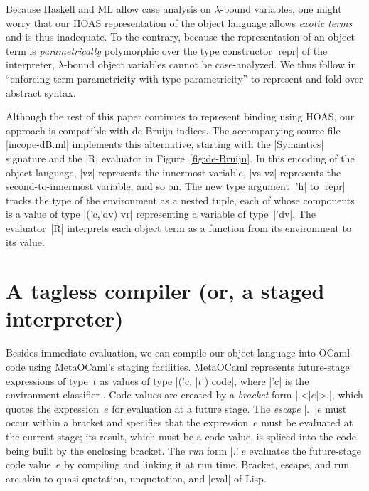 Because Haskell and ML allow case analysis on $\lambda$-bound variables,
one might worry that our HOAS representation of the object language
allows \emph{exotic terms} and is thus inadequate.  To the contrary,
because the representation of an object term is \emph{parametrically}
polymorphic over the type constructor |repr| of the interpreter,
$\lambda$-bound object variables cannot be case-analyzed.
We thus follow \citet{washburn-boxes-jfp} in ``enforcing term
parametricity with type parametricity'' to represent and fold over
abstract syntax.

Although the rest of this paper continues to represent binding
using HOAS\@, our approach is compatible with de Bruijn indices.
The accompanying source file |incope-dB.ml| implements this
alternative, starting with the |Symantics| signature and the |R|
evaluator in Figure~\ref{fig:de-Bruijn}.
In this encoding of the object language, |vz| represents the
innermost variable, |vs vz| represents the second-to-innermost variable,
and so on.  The new type argument |'h| to |repr| tracks the type of
the environment as a nested tuple, each of whose components is a
value of type |('c,'dv) vr| representing a variable of type~|'dv|.
The evaluator~|R| interprets each object term as a function
from its environment to its value.

\section{A tagless compiler (or, a staged interpreter)}\label{S:compiler}

Besides immediate evaluation, we can compile our object language
into OCaml code using MetaOCaml's staging facilities. MetaOCaml
represents future-stage expressions of type~$t$
as values of type |('c, |$t$|) code|, where |'c| is the
environment classifier \citep{WalidPOPL03,calcagno-ml-like}. Code values are created
by a \emph{bracket} form |.<|$e$|>.|, which quotes the expression~$e$ for
evaluation at a future stage. The \emph{escape} |.~|$e$ must occur
within a bracket and specifies that the expression~$e$ must be evaluated
at the current stage; its result, which must be a code value, is
spliced into the code being built by the enclosing bracket. The \emph{run} form |.!|$e$ evaluates
the future-stage code value~$e$ by compiling and linking it at run time.
Bracket, escape, and run are akin to
quasi-quotation, unquotation, and |eval| of Lisp.

